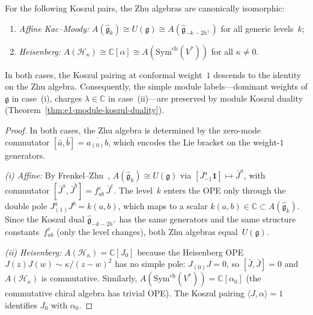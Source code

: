 \begin{proposition}
\label{prop:zhu-koszul-compatibility}
For the following Koszul pairs, the Zhu algebras are canonically
isomorphic:
\begin{enumerate}[label=\textup{(\roman*)}]
\item \emph{Affine Kac--Moody:}
  $A(\widehat{\mathfrak{g}}_k) \cong U(\mathfrak{g})
  \cong A(\widehat{\mathfrak{g}}_{-k-2h^\vee})$
  for all generic levels~$k$;
\item \emph{Heisenberg:}
  $A(\mathcal{H}_\kappa) \cong \mathbb{C}[\alpha]
  \cong A(\mathrm{Sym}^{\mathrm{ch}}(V^*))$
  for all $\kappa \neq 0$.
\end{enumerate}
In both cases, the Koszul pairing at conformal weight~$1$ descends to
the identity on the Zhu algebra.  Consequently, the simple module
labels---dominant weights of $\mathfrak{g}$ in case~\textup{(i)},
charges $\lambda \in \mathbb{C}$ in case~\textup{(ii)}---are
preserved by module Koszul duality
\textup{(}Theorem~\textup{\ref{thm:e1-module-koszul-duality})}.
\end{proposition}

\begin{proof}
In both cases, the Zhu algebra is determined by the zero-mode
commutator $[\bar{a}, \bar{b}] = \overline{a_{(0)}b}$, which
encodes the Lie bracket on the weight-$1$ generators.

\emph{(i) Affine:}
By Frenkel--Zhu~\cite{FZ92},
$A(\widehat{\mathfrak{g}}_k) \cong U(\mathfrak{g})$ via
$[J^a_{-1}\mathbf{1}] \mapsto \bar{J}^a$, with commutator
$[\bar{J}^a, \bar{J}^b] = f_{ab}^c\, \bar{J}^c$.  The level~$k$
enters the OPE only through the double pole
$J^a_{(1)}J^b = k(a,b)$, which maps to a scalar
$k(a,b) \in \mathbb{C} \subset A(\widehat{\mathfrak{g}}_k)$.
Since the Koszul dual $\widehat{\mathfrak{g}}_{-k-2h^\vee}$
has the same generators and the same structure constants~$f_{ab}^c$
(only the level changes), both Zhu algebras equal~$U(\mathfrak{g})$.

\emph{(ii) Heisenberg:}
$A(\mathcal{H}_\kappa) = \mathbb{C}[J_0]$ because the Heisenberg
OPE $J(z)J(w) \sim \kappa/(z-w)^2$ has no simple pole:
$J_{(0)}J = 0$, so $[\bar{J}, \bar{J}] = 0$ and $A(\mathcal{H}_\kappa)$
is commutative.  Similarly,
$A(\mathrm{Sym}^{\mathrm{ch}}(V^*)) = \mathbb{C}[\alpha_0]$
(the commutative chiral algebra has trivial OPE).  The Koszul pairing
$\langle J, \alpha \rangle = 1$ identifies $J_0$ with $\alpha_0$.
\end{proof}

